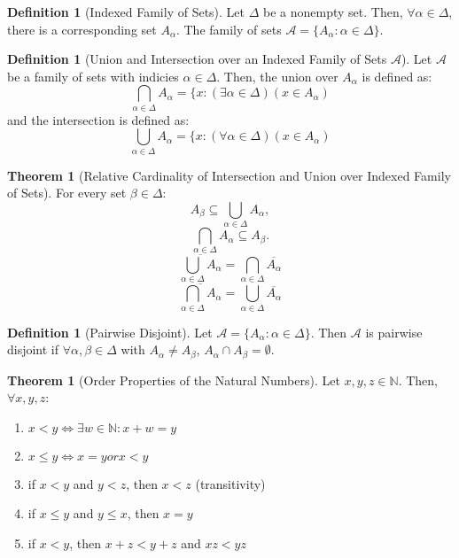 \documentclass[10pt]{article}
\theoremstyle{definition}
\newtheorem{definition}[equation]{Definition}
\newtheorem{theorem}[equation]{Theorem}
\newcommand{\N}{\mathbb{N}}
\begin{document}
\begin{definition}[Indexed Family of Sets]
  Let $\Delta$ be a nonempty set. Then, $\forall\alpha\in\Delta$, there is a corresponding set $A_\alpha$. The family of sets $\mathcal{A} = \{A_\alpha: \alpha\in\Delta\}$.
\end{definition}

\begin{definition}[Union and Intersection over an Indexed Family of Sets $\mathcal{A}$]
  Let $\mathcal{A}$ be a family of sets with indicies $\alpha\in\Delta$. Then, the union over $A_\alpha$ is defined as:
  $$\bigcap_{\alpha\in\Delta} A_\alpha = \{x: (\exists\alpha\in\Delta)(x\in A_\alpha)$$
  and the intersection is defined as:
  $$\bigcup_{\alpha\in\Delta} A_\alpha = \{x: (\forall\alpha\in\Delta)(x\in A_\alpha)$$
\end{definition}

\begin{theorem}[Relative Cardinality of Intersection and Union over Indexed Family of Sets]
  For every set $\beta\in\Delta$:
    $$A_\beta \subseteq \bigcup_{\alpha\in\Delta} A_\alpha,$$
    $$\bigcap_{\alpha\in\Delta} A_\alpha \subseteq A_\beta.$$
    $$\overline{\bigcup_{\alpha\in\Delta} A_\alpha} = \bigcap_{\alpha\in\Delta} \overline{A_\alpha}$$
    $$\overline{\bigcap_{\alpha\in\Delta} A_\alpha} = \bigcup_{\alpha\in\Delta} \overline{A_\alpha}$$
\end{theorem}

\begin{definition}[Pairwise Disjoint]
  Let $\mathcal{A} = \{A_\alpha : \alpha\in\Delta\}$. Then $\mathcal{A}$ is pairwise disjoint if $\forall\alpha,\beta\in\Delta$ with $A_\alpha\neq A_\beta$, $A_\alpha \cap A_\beta = \emptyset$.
\end{definition}

\begin{theorem}[Order Properties of the Natural Numbers]
  Let $x,y,z\in\N$. Then, $\forall x,y,z$:
  \begin{enumerate}
    \item $x<y \iff \exists w\in\N: x+w=y$
    \item $x\leq y \iff x=y or x<y$
    \item if $x<y$ and $y<z$, then $x<z$ (transitivity)
    \item if $x\leq y$ and $y\leq x$, then $x=y$
    \item if $x<y$, then $x+z < y+z$ and $xz<yz$
  \end{enumerate}
\end{theorem}
\end{document}
